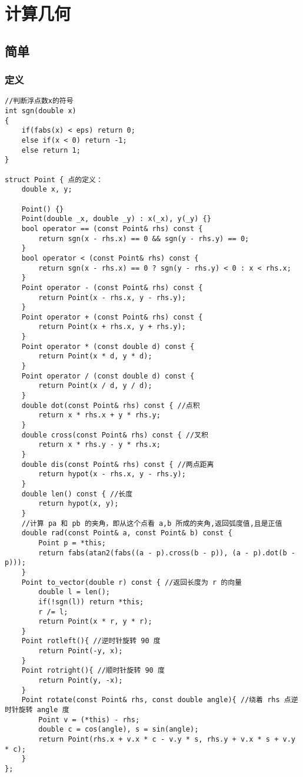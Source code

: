 %
%
\chapter{计算几何}

\section{简单}

\subsection{定义}
\begin{lstlisting}
//判断浮点数x的符号
int sgn(double x)
{
    if(fabs(x) < eps) return 0;
    else if(x < 0) return -1;
    else return 1;
}

struct Point { 点的定义：
    double x, y;

    Point() {}
    Point(double _x, double _y) : x(_x), y(_y) {}
    bool operator == (const Point& rhs) const {
        return sgn(x - rhs.x) == 0 && sgn(y - rhs.y) == 0;
    }
    bool operator < (const Point& rhs) const {
        return sgn(x - rhs.x) == 0 ? sgn(y - rhs.y) < 0 : x < rhs.x;
    }
    Point operator - (const Point& rhs) const {
        return Point(x - rhs.x, y - rhs.y);
    }
    Point operator + (const Point& rhs) const {
        return Point(x + rhs.x, y + rhs.y);
    }
    Point operator * (const double d) const {
        return Point(x * d, y * d);
    }
    Point operator / (const double d) const {
        return Point(x / d, y / d);
    }
    double dot(const Point& rhs) const { //点积
        return x * rhs.x + y * rhs.y;
    }
    double cross(const Point& rhs) const { //叉积
        return x * rhs.y - y * rhs.x;
    }
    double dis(const Point& rhs) const { //两点距离
        return hypot(x - rhs.x, y - rhs.y);
    }
    double len() const { //长度
        return hypot(x, y);
    }
    //计算 pa 和 pb 的夹角，即从这个点看 a,b 所成的夹角,返回弧度值,且是正值
    double rad(const Point& a, const Point& b) const {
        Point p = *this;
        return fabs(atan2(fabs((a - p).cross(b - p)), (a - p).dot(b - p)));
    }
    Point to_vector(double r) const { //返回长度为 r 的向量
        double l = len();
        if(!sgn(l)) return *this;
        r /= l;
        return Point(x * r, y * r);
    }
    Point rotleft(){ //逆时针旋转 90 度
        return Point(-y, x);
    }
    Point rotright(){ //顺时针旋转 90 度
        return Point(y, -x);
    }
    Point rotate(const Point& rhs, const double angle){ //绕着 rhs 点逆时针旋转 angle 度
        Point v = (*this) - rhs;
        double c = cos(angle), s = sin(angle);
        return Point(rhs.x + v.x * c - v.y * s, rhs.y + v.x * s + v.y * c);
    }
};
\end{lstlisting}

